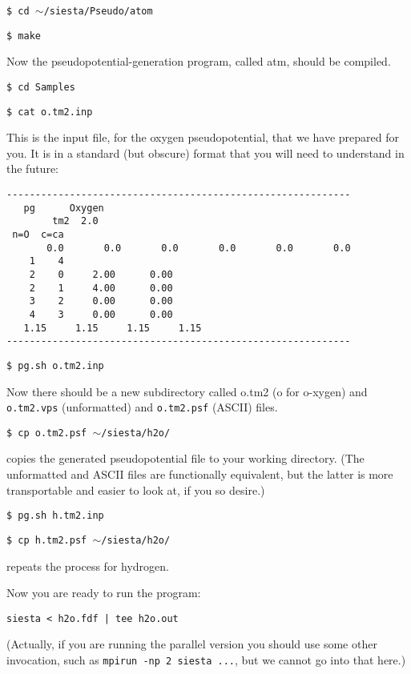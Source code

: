 \documentclass[11pt]{article}
\begin{document}
{\tt \$ cd $\sim$/siesta/Pseudo/atom}

{\tt \$ make}

\noindent
Now the pseudopotential-generation program, called atm, 
should be compiled.

{\tt \$ cd Samples}

{\tt \$ cat o.tm2.inp}

\noindent
This is the input file, for the oxygen pseudopotential, 
that we have prepared for you. 
It is in a standard (but obscure) format that
you will need to understand in the future:
\begin{verbatim}
------------------------------------------------------------
   pg      Oxygen
        tm2  2.0
 n=O  c=ca 
       0.0       0.0       0.0       0.0       0.0       0.0
    1    4
    2    0     2.00      0.00
    2    1     4.00      0.00
    3    2     0.00      0.00
    4    3     0.00      0.00
   1.15     1.15     1.15     1.15
------------------------------------------------------------
\end{verbatim}

{\tt \$ pg.sh o.tm2.inp}

\noindent
Now there should be a new subdirectory called o.tm2 (o for o-xygen)
and {\tt o.tm2.vps} (unformatted) and {\tt o.tm2.psf} (ASCII) files.

{\tt \$ cp o.tm2.psf $\sim$/siesta/h2o/}

\noindent
copies the generated pseudopotential file to your working directory. 
(The unformatted and ASCII files are functionally equivalent, but
the latter is more transportable and easier to look at, if you so
desire.)

{\tt \$ pg.sh h.tm2.inp}

{\tt \$ cp h.tm2.psf $\sim$/siesta/h2o/}

\noindent
repeats the process for hydrogen.


\noindent
Now you are ready to run the program:

{\tt siesta < h2o.fdf | tee h2o.out}

\noindent
(Actually, if you are running the parallel version
you should use some other invocation, such as {\tt mpirun -np 2 siesta
...}, but we cannot go into that
here.)
\end{document}
